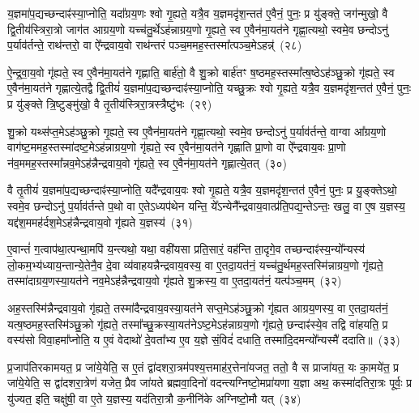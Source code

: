 य॒ज्ञमा॑प॒द्यच्छन्दाꣴ॑स्या॒प्नोति॒ यदा᳚ग्रय॒णः श्वो गृ॒ह्यते॒ यत्रै॒व य॒ज्ञमदृ॑श॒न्तत॑ ए॒वैनं॒ पुनः॒ प्र यु॑ङ्क्ते॒ जग॑न्मुखो॒ वै द्वि॒तीय॑स्त्रिरा॒त्रो जाग॑त आग्रय॒णो यच्च॑तु॒र्थे\-ऽह॑न्नाग्रय॒णो गृ॒ह्यते॒ स्व ए॒वैन॑मा॒यत॑ने गृह्णा॒त्यथो॒ स्वमे॒व छन्दो\-ऽनु॑ प॒र्याव॑र्तन्ते॒ राथ॑न्तरो॒ वा ऐ᳚न्द्रवाय॒वो राथ॑न्तरं पञ्च॒ममह॒स्तस्मा᳚त्पञ्च॒मे\-ऽहन्न्॑~(२८)

ऐ॒न्द्र॒वा॒य॒वो गृ॑ह्यते॒ स्व ए॒वैन॑मा॒यत॑ने गृह्णाति॒ बार्\mbox{}ह॑तो॒ वै शु॒क्रो बार्\mbox{}ह॑तꣳ ष॒ष्ठमह॒स्तस्मा᳚त्ष॒ष्ठे\-ऽह॑ञ्छु॒क्रो गृ॑ह्यते॒ स्व ए॒वैन॑मा॒यत॑ने गृह्णात्ये॒तद्वै द्वि॒तीयं॑ य॒ज्ञमा॑प॒द्यच्छन्दाꣴ॑स्या॒प्नोति॒ यच्छु॒क्रः श्वो गृ॒ह्यते॒ यत्रै॒व य॒ज्ञमदृ॑श॒न्तत॑ ए॒वैनं॒ पुनः॒ प्र यु॑ङ्क्ते त्रि॒ष्टुङ्मु॑खो॒ वै तृ॒तीय॑स्त्रिरा॒त्रस्त्रैष्टु॑भः~(२९)

शु॒क्रो यथ्स॑प्त॒मे\-ऽह॑ञ्छु॒क्रो गृ॒ह्यते॒ स्व ए॒वैन॑मा॒यत॑ने गृह्णा॒त्यथो॒ स्वमे॒व छन्दो\-ऽनु॑ प॒र्याव॑र्तन्ते॒ वाग्वा आ᳚ग्रय॒णो वाग॑ष्ट॒ममह॒स्तस्मा॑दष्ट॒मे\-ऽह॑न्नाग्रय॒णो गृ॑ह्यते॒ स्व ए॒वैन॑मा॒यत॑ने गृह्णाति प्रा॒णो वा ऐ᳚न्द्रवाय॒वः प्रा॒णो न॑व॒ममह॒स्तस्मा᳚न्नव॒मे\-ऽह॑न्नैन्द्रवाय॒वो गृ॑ह्यते॒ स्व ए॒वैन॑मा॒यत॑ने गृह्णात्ये॒तत्~(३०)

वै तृ॒तीयं॑ य॒ज्ञमा॑प॒द्यच्छन्दाꣴ॑स्या॒प्नोति॒ यदै᳚न्द्रवाय॒वः श्वो गृ॒ह्यते॒ यत्रै॒व य॒ज्ञमदृ॑श॒न्तत॑ ए॒वैनं॒ पुनः॒ प्र यु॒ङ्क्ते\-ऽथो॒ स्वमे॒व छन्दो\-ऽनु॑ प॒र्याव॑र्तन्ते प॒थो वा ए॒ते\-ऽध्यप॑थेन यन्ति॒ ये᳚\-ऽन्येनै᳚न्द्रवाय॒वात्प्र॑ति॒पद्य॒न्ते\-ऽन्तः॒ खलु॒ वा ए॒ष य॒ज्ञस्य॒ यद्द॑श॒ममह॑र्दश॒मे\-ऽह॑न्नैन्द्रवाय॒वो गृ॑ह्यते य॒ज्ञस्य॑~(३१)

ए॒वान्तं॑ ग॒त्वाप॑था॒त्पन्था॒मपि॑ य॒न्त्यथो॒ यथा॒ वही॑यसा प्रति॒सारं॒ वह॑न्ति ता॒दृगे॒व तच्छन्दाꣴ॑स्य॒न्यो᳚न्यस्य॑ लो॒कम॒भ्य॑ध्याय॒न्तान्ये॒तेनै॒व दे॒वा व्य॑वाहयन्नैन्द्रवाय॒वस्य॒ वा ए॒तदा॒यत॑नं॒ यच्च॑तु॒र्थमह॒स्तस्मि॑न्नाग्रय॒णो गृ॑ह्यते॒ तस्मा॑दाग्रय॒णस्या॒यत॑ने नव॒मे\-ऽह॑न्नैन्द्रवाय॒वो गृ॑ह्यते शु॒क्रस्य॒ वा ए॒तदा॒यत॑नं॒ यत्प॑ञ्च॒मम्~(३२)

अह॒स्तस्मि॑न्नैन्द्रवाय॒वो गृ॑ह्यते॒ तस्मा॑दैन्द्रवाय॒वस्या॒यत॑ने सप्त॒मे\-ऽह॑ञ्छु॒क्रो गृ॑ह्यत आग्रय॒णस्य॒ वा ए॒तदा॒यत॑नं॒ यत्ष॒ष्ठमह॒स्तस्मि॑ञ्छु॒क्रो गृ॑ह्यते॒ तस्मा᳚च्छु॒क्रस्या॒यत॑ने\-ऽष्ट॒मे\-ऽह॑न्नाग्रय॒णो गृ॑ह्यते॒ छन्दाꣴ॑स्ये॒व तद्वि वा॑हयति॒ प्र वस्य॑सो विवा॒हमा᳚प्नोति॒ य ए॒वं वेदाथो॑ दे॒वता᳚भ्य ए॒व य॒ज्ञे सं॒विदं॑ दधाति॒ तस्मा॑दि॒दमन्यो᳚न्यस्मै॑ ददाति॥~(३३)

{\anuvakamend[{ए॒तद्वै प॑ञ्च॒मे\-ऽह॒न्त्रैष्टु॑भ ए॒तद्गृ॑ह्यते य॒ज्ञस्य॑ प़ञ्च॒मम॒न्यस्मा॒ एक॑ञ्च}]}%

प्र॒जा\-प॑तिरकामयत॒ प्र जा॑ये॒येति॒ स ए॒तं द्वा॑दशरा॒त्रम॑पश्य॒त्तमाह॑र॒त्तेना॑यजत॒ ततो॒ वै स प्राजा॑यत॒ यः का॒मये॑त॒ प्र जा॑ये॒येति॒ स द्वा॑दशरा॒त्रेण॑ यजेत॒ प्रैव जा॑यते ब्रह्मवा॒दिनो॑ वदन्त्यग्निष्टो॒मप्रा॑यणा य॒ज्ञा अथ॒ कस्मा॑दतिरा॒त्रः पूर्वः॒ प्र यु॑ज्यत॒ इति॒ चक्षु॑षी॒ वा ए॒ते य॒ज्ञस्य॒ यद॑तिरा॒त्रौ क॒नीनि॑के अग्निष्टो॒मौ यत्~(३४)

